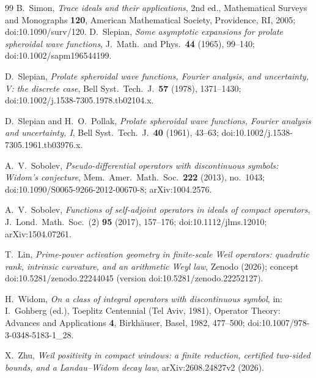\begin{thebibliography}{99}
 B.~Simon, \emph{Trace ideals and their applications},
2nd ed., Mathematical Surveys and Monographs \textbf{120},
American Mathematical Society, Providence, RI, 2005;
doi:10.1090/surv/120.
 D.~Slepian, \emph{Some asymptotic expansions for prolate
spheroidal wave functions}, J.\ Math.\ and Phys.\ \textbf{44} (1965), 99--140;
doi:10.1002/sapm196544199.

 D.~Slepian, \emph{Prolate spheroidal wave functions,
Fourier analysis, and uncertainty, V: the discrete case}, Bell Syst.\ Tech.\
J.\ \textbf{57} (1978), 1371--1430; doi:10.1002/j.1538-7305.1978.tb02104.x.

 D.~Slepian and H.~O.~Pollak, \emph{Prolate
spheroidal wave functions, Fourier analysis and uncertainty, I}, Bell Syst.\
Tech.\ J.\ \textbf{40} (1961), 43--63; doi:10.1002/j.1538-7305.1961.tb03976.x.

\bibitem{Sobolev2013} A.~V.~Sobolev, \emph{Pseudo-differential operators with
discontinuous symbols: Widom's conjecture}, Mem.\ Amer.\ Math.\ Soc.\ \textbf{222}
(2013), no.~1043; doi:10.1090/S0065-9266-2012-00670-8; arXiv:1004.2576.

\bibitem{Sobolev2017} A.~V.~Sobolev, \emph{Functions of self-adjoint operators in
ideals of compact operators}, J.\ Lond.\ Math.\ Soc.\ (2) \textbf{95} (2017),
157--176; doi:10.1112/jlms.12010; arXiv:1504.07261.

 T.~Lin, \emph{Prime-power activation geometry in
finite-scale Weil operators: quadratic rank, intrinsic curvature, and an
arithmetic Weyl law}, Zenodo (2026); concept doi:10.5281/zenodo.22244045
(version doi:10.5281/zenodo.22252127).

 H.~Widom, \emph{On a class of integral operators with
discontinuous symbol}, in: I.~Gohberg (ed.), Toeplitz Centennial (Tel Aviv,
1981), Operator Theory: Advances and Applications \textbf{4}, Birkh\"auser,
Basel, 1982, 477--500; doi:10.1007/978-3-0348-5183-1\_28.

 X.~Zhu, \emph{Weil positivity in compact windows: a finite
reduction, certified two-sided bounds, and a Landau--Widom decay law},
arXiv:2608.24827v2 (2026).

\end{thebibliography}
